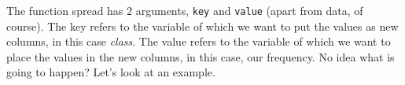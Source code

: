 \documentclass[]{tufte-book}
\newenvironment{Shaded}{}{}
\newcommand{\DataTypeTok}[1]{\textcolor[rgb]{0.56,0.13,0.00}{#1}}
\newcommand{\KeywordTok}[1]{\textcolor[rgb]{0.00,0.44,0.13}{\textbf{#1}}}
\newcommand{\NormalTok}[1]{#1}
\newcommand{\OperatorTok}[1]{\textcolor[rgb]{0.40,0.40,0.40}{#1}}
\newcommand{\StringTok}[1]{\textcolor[rgb]{0.25,0.44,0.63}{#1}}
\begin{document}
The function spread has 2 arguments, \texttt{key} and \texttt{value} (apart from data, of course). The key refers to the variable of which we want to put the values as new columns, in this case \emph{class}. The value refers to the variable of which we want to place the values in the new columns, in this case, our frequency. No idea what is going to happen? Let's look at an example.

\begin{Shaded}
\end{Shaded}
\end{document}
